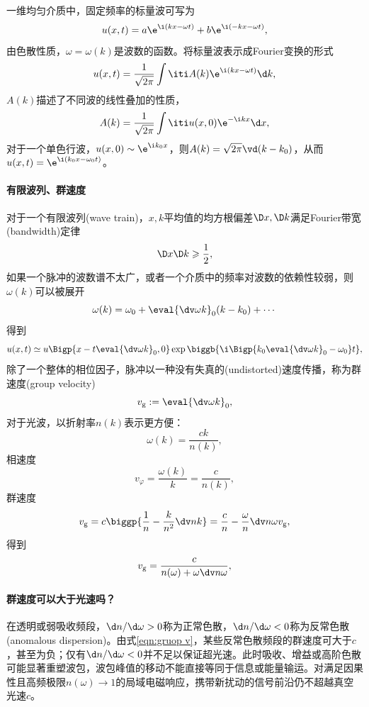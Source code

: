 一维均匀介质中，固定频率的标量波可写为
\[
    u(x,t)=a\e^{\i(kx-\omega t)}+b\e^{\i(-kx-\omega t)},
\]
由色散性质，$\omega=\omega(k)$是波数的函数。将标量波表示成Fourier变换的形式
\[
    u(x,t)=\frac1{\sqrt{2\pi}}\int\iti A(k)\e^{\i(kx-\omega t)}\d k,
\]
$A(k)$描述了不同波的线性叠加的性质，
\[
    A(k)=\frac1{\sqrt{2\pi}}\int\iti u(x,0)\e^{-\i kx}\d x,
\]
对于一个单色行波，$u(x,0)\sim\e^{\i k_0x}$，则$A(k)=\sqrt{2\pi}\vd(k-k_0)$，从而$u(x,t)=\e^{\i(k_0x-\omega_0t)}$。

\paragraph{有限波列、群速度}

对于一个有限波列(wave train)，$x,k$平均值的均方根偏差$\D x,\D k$满足Fourier带宽(bandwidth)定律
\begin{equation}
    \D x\D k\geqslant\frac12,
\end{equation}
如果一个脉冲的波数谱不太广，或者一个介质中的频率对波数的依赖性较弱，则$\omega(k)$可以被展开
\[
    \omega(k)=\omega_0+\eval{\dv\omega k}_0(k-k_0)+\cdots
\]
得到 
\[
    u(x,t)\simeq u\Bigp{x-t\eval{\dv\omega k}_0,0}\exp\biggb{\i\Bigp{k_0\eval{\dv\omega k}_0-\omega_0}t},
\]
除了一个整体的相位因子，脉冲以一种没有失真的(undistorted)速度传播，称为群速度(group velocity)
\begin{equation}
    v_\text g:=\eval{\dv\omega k}_0,
\end{equation}
对于光波，以折射率$n(k)$表示更方便：
\[
    \omega(k)=\frac{ck}{n(k)},
\]
相速度
\[
    v_\varphi=\frac{\omega(k)}k=\frac c{n(k)},
\]
群速度
\[
    v_\text g=c\biggp{\frac1n-\frac k{n^2}\dv nk}=\frac cn-\frac\omega n\dv n\omega v_\text g,
\]
得到 
\begin{equation}
    \label{eqn:gruop v}
    v_\text g=\frac c{\displaystyle n(\omega)+\omega\dv n\omega},
\end{equation}

\paragraph{群速度可以大于光速吗？}

在透明或弱吸收频段，$\d n/\d\omega>0$称为正常色散，$\d n/\d\omega<0$称为反常色散(anomalous dispersion)。由式\eqref{eqn:gruop v}，某些反常色散频段的群速度可大于$c$，甚至为负；仅有$\d n/\d\omega<0$并不足以保证超光速。此时吸收、增益或高阶色散可能显著重塑波包，波包峰值的移动不能直接等同于信息或能量输运。对满足因果性且高频极限$n(\omega)\to1$的局域电磁响应，携带新扰动的信号前沿仍不超越真空光速$c$。

